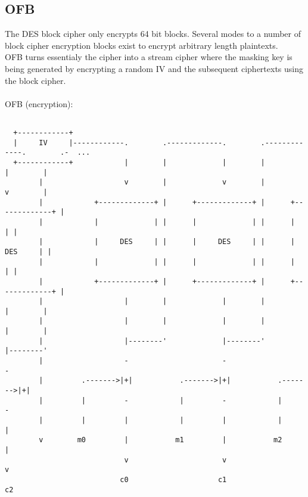 \documentclass{article}
\begin{document}
\subsection{OFB}
The DES block cipher only encrypts 64 bit blocks. Several modes to a number of block cipher encryption blocks exist to encrypt arbitrary length plaintexts.\\
OFB turns essentialy the cipher into a stream cipher where the masking key is being generated by encrypting a random IV and the subsequent ciphertexts using the block cipher.\\
\\
OFB (encryption):
\small
\begin{verbatim}

  +------------+                                                   
  |     IV     |------------.        .-------------.        .-------------.        .-  ...                                                                      
  +------------+            |        |             |        |             |        |                                                    
        |                   v        |             v        |             v        |                                                      
        |            +-------------+ |      +-------------+ |      +-------------+ |                                                
        |            |             | |      |             | |      |             | |                                                    
        |            |     DES     | |      |     DES     | |      |     DES     | |                                                      
        |            |             | |      |             | |      |             | |                                                    
        |            +-------------+ |      +-------------+ |      +-------------+ |                                                  
        |                   |        |             |        |             |        |                                                   
        |                   |        |             |        |             |        |                                                   
        |                   |--------'             |--------'             |--------'                                                   
        |                   -                      -                      -                                                                
        |         .------->|+|           .------->|+|           .------->|+|                                                             
        |         |         -            |         -            |         -                                                            
        |         |         |            |         |            |         |                                                             
        v        m0         |           m1         |           m2         |                                                               
                            v                      v                      v                                                          
                           c0                     c1                     c2                                                          
\end{verbatim}
\end{document}
